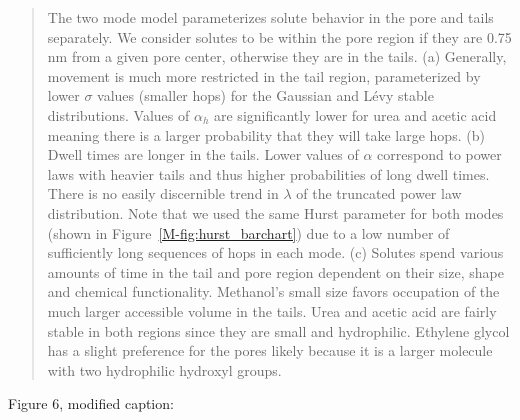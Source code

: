 \documentclass{article}
\begin{document}
\begin{enumerate}[label={Comment \theenumi :}, leftmargin=3.9\parindent]
\begin{quote}
		  The two mode model parameterizes solute behavior in the pore and tails
	      separately. We consider solutes to be within the pore region if they
	      are 0.75 nm from a given pore center, otherwise they are in the
	      tails. (a) Generally, movement is much more restricted in the tail
	      region, parameterized by lower $\sigma$ values (smaller hops) for the
	      Gaussian and L\'evy stable distributions. Values of $\alpha_h$ are
	      significantly lower for urea and acetic acid meaning there is a
	      larger probability that they will take large hops. (b) Dwell times
	      are longer in the tails. Lower values of $\alpha$ correspond to power
	      laws with heavier tails and thus higher probabilities of long dwell
	      times. There is no easily discernible trend in $\lambda$ of the
	      truncated power law distribution. Note that we used the same Hurst
	      parameter for both modes (shown in Figure~\ref{M-fig:hurst_barchart})
	      due to a low number of sufficiently long sequences of hops in each
	      mode. (c) Solutes spend various amounts of time in the tail and pore
	      region dependent on their size, shape and chemical functionality.
	      Methanol's small size favors occupation of the much larger accessible
	      volume in the tails. Urea and acetic acid are fairly stable in both
	      regions since they are small and hydrophilic. Ethylene glycol has a
	      slight preference for the pores likely because it is a larger
	      molecule with two hydrophilic hydroxyl groups.
	  
        \end{quote}
	
	    Figure 6, modified caption:
	 

\end{enumerate}
\end{document}
